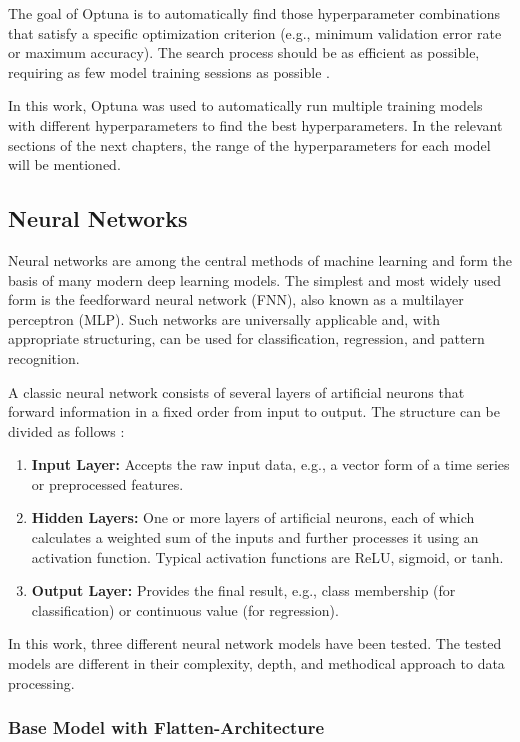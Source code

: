 The goal of Optuna is to automatically find those hyperparameter combinations that satisfy a specific optimization criterion (e.g., minimum validation error rate or maximum accuracy).
The search process should be as efficient as possible, requiring as few model training sessions as possible \cite{optuna-hyperparameters}.

In this work, Optuna was used to automatically run multiple training models with different hyperparameters to find the best hyperparameters.
In the relevant sections of the next chapters, the range of the hyperparameters for each model will be mentioned.

\subsection{Neural Networks}

Neural networks are among the central methods of machine learning and form the basis of many modern deep learning models.
The simplest and most widely used form is the feedforward neural network (FNN), also known as a multilayer perceptron (MLP).
Such networks are universally applicable and, with appropriate structuring, can be used for classification, regression, and pattern recognition.


A classic neural network consists of several layers of artificial neurons that forward information in a fixed order from input to output.
The structure can be divided as follows \cite{nn-basics}:

\begin{enumerate}
    \item \textbf{Input Layer:} Accepts the raw input data, e.g., a vector form of a time series or preprocessed features.
    \item \textbf{Hidden Layers:} One or more layers of artificial neurons, each of which calculates a weighted sum of the inputs and further processes it using an activation function.
    Typical activation functions are ReLU, sigmoid, or tanh.
    \item \textbf{Output Layer:} Provides the final result, e.g., class membership (for classification) or continuous value (for regression).
\end{enumerate}

In this work, three different neural network models have been tested.
The tested models are different in their complexity, depth, and methodical approach to data processing.

\subsubsection{Base Model with Flatten-Architecture}

